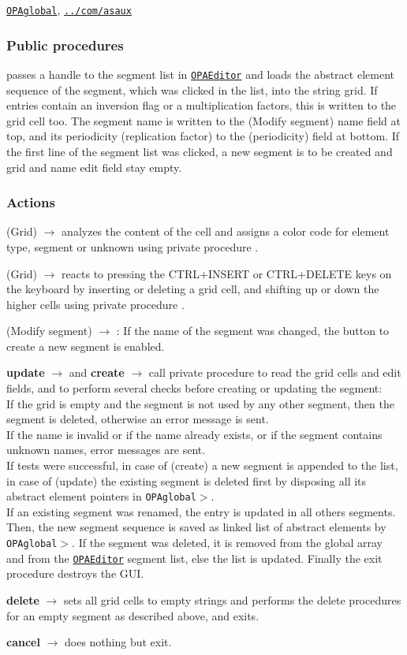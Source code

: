 \documentclass[12pt]{article}
\newcommand\code[1]{{\tt #1}}
\newcommand{\ofld}[1]{\colorbox{black!15}{{\bf #1}}}
\newcommand{\ofldx}[1]{\colorbox{black!15}{(#1)}}
\newcommand\guico[1]{{\color{blue}\code{#1}}}
\newcommand{\unico}[1]{{\color{burntorange}\code{#1}}}
\newcommand{\evcod}[2]{\ofld{#1} $\rightarrow$ \guico{#2}}
\newcommand{\evcodx}[2]{\ofldx{#1} $\rightarrow$ \guico{#2}}
\newcommand{\prcod}[2]{\opauni{#1}$>$\unico{#2}}
\newcommand{\opagui}[1]{\colorbox{blue!20}{\code{#1}}}
\newcommand{\ogui}[1]{\hyperref[#1]{\opagui{#1}}}
\newcommand{\opauni}[1]{\colorbox{orange!30}{\code{#1}}}
\newcommand{\ouni}[1]{\hyperref[#1]{\opauni{#1}}}
\newcommand{\uses}[1]{\flushleft {\bf Uses:} #1}
\newcommand{\act}[1]{\subsubsection*{Actions} #1}
\newcommand{\ppro}[1]{\subsubsection*{Public procedures} #1}
\begin{document}
\uses{\ouni{OPAglobal}, \ouni{../com/asaux}}

\ppro{
\guico{Init} passes a handle to the segment list in \ogui{OPAEditor} and loads the abstract element sequence of the segment, which was clicked in the list, into the string grid. If entries contain an inversion flag or a multiplication factors, this is written to the grid cell too. The segment name is written to the \ofldx{Modify segment} name field at top, and its periodicity (replication factor) to the \ofldx{periodicity} field at bottom. If the first line of the segment list was clicked, a new segment is to be created and grid and name edit field stay empty.
}
\act{
\evcodx{Grid}{drawCell} analyzes the content of the cell and assigns a color code for element type, segment or unknown using private procedure \guico{ElemCol\_C}.

\evcodx{Grid}{gridKeyDown} reacts to pressing the CTRL+INSERT or CTRL+DELETE keys on the keyboard by inserting or deleting a grid cell, and shifting up or down the higher cells using private procedure \guico{ShiftCells}.

\evcodx{Modify segment}{EditSegNameChange}: If the name of the segment was changed, the button to create a new segment is enabled.

\evcod{update}{butokClick} and \evcod{create}{butcreClick} call private procedure \guico{SaveSeg} to read the grid cells and edit fields, and to perform several checks before creating or updating the segment:\\
If the grid is empty and the segment is not used by any other segment, then the segment is deleted, otherwise an error message is sent.\\
If the name is invalid or if the name already exists, or if the  segment contains unknown names, error messages are sent.\\
If tests were successful, in case of \ofldx{create} a new segment is appended to the list, in case of \ofldx{update} the existing segment is deleted first by disposing all its abstract element pointers in \prcod{OPAglobal}{ClearSeg}.\\
If an existing segment was renamed, the entry is updated in all others segments. Then, 
the new segment sequence is saved as linked list of abstract elements by \prcod{OPAglobal}{AppendAE}. If the segment was deleted, it is removed from the global \unico{Segm} array and from the \ogui{OPAEditor} segment list, else the list is updated. Finally the exit procedure destroys the GUI.

\evcod{delete}{butdelClick} sets all grid cells to empty strings and performs the delete procedures for an empty segment as described above, and exits.

\evcod{cancel}{butcanClick} does nothing but exit.
}
\end{document}
